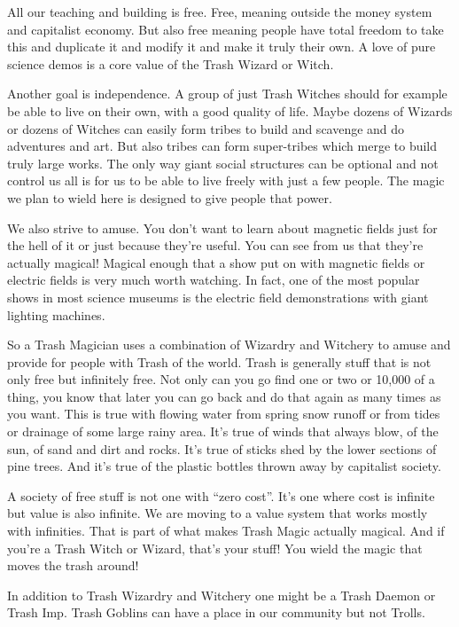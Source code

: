 All our teaching and building is free. Free, meaning outside the money
system and capitalist economy. But also free meaning people have total
freedom to take this and duplicate it and modify it and make it truly
their own. A love of pure science demos is a core value of the Trash
Wizard or Witch.

Another goal is independence. A group of just Trash Witches should for
example be able to live on their own, with a good quality of life. Maybe
dozens of Wizards or dozens of Witches can easily form tribes to build
and scavenge and do adventures and art. But also tribes can form
super-tribes which merge to build truly large works. The only way giant
social structures can be optional and not control us all is for us to be
able to live freely with just a few people. The magic we plan to wield
here is designed to give people that power.

We also strive to amuse. You don't want to learn about magnetic fields
just for the hell of it or just because they're useful. You can see from
us that they're actually magical! Magical enough that a show put on with
magnetic fields or electric fields is very much worth watching. In fact,
one of the most popular shows in most science museums is the electric
field demonstrations with giant lighting machines.

So a Trash Magician uses a combination of Wizardry and Witchery to amuse
and provide for people with Trash of the world. Trash is generally stuff
that is not only free but infinitely free. Not only can you go find one
or two or 10,000 of a thing, you know that later you can go back and do
that again as many times as you want. This is true with flowing water
from spring snow runoff or from tides or drainage of some large rainy
area. It's true of winds that always blow, of the sun, of sand and dirt
and rocks. It's true of sticks shed by the lower sections of pine trees.
And it's true of the plastic bottles thrown away by capitalist society.

A society of free stuff is not one with ``zero cost''. It's one where
cost is infinite but value is also infinite. We are moving to a value
system that works mostly with infinities. That is part of what makes
Trash Magic actually magical. And if you're a Trash Witch or Wizard,
that's your stuff! You wield the magic that moves the trash around!

In addition to Trash Wizardry and Witchery one might be a Trash Daemon
or Trash Imp. Trash Goblins can have a place in our community but not
Trolls.

